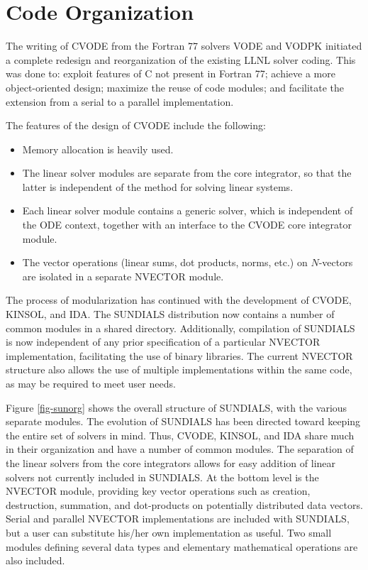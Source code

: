 \section{Code Organization}
\label{s:organization}

The writing of CVODE from the Fortran 77 solvers VODE and VODPK initiated a
complete redesign and reorganization of the existing LLNL solver coding.
This was done to: exploit features of C not present in Fortran 77;
achieve a more object-oriented design; maximize the reuse of code
modules; and facilitate the extension from a serial to a parallel
implementation.

The features of the design of CVODE include the following:
\begin{itemize}
\item Memory allocation is heavily used.
\item The linear solver modules are separate from the core integrator,
so that the latter is independent of the method for solving linear
systems.
\item Each linear solver module contains  a generic solver, which is
independent of the ODE context, together with an interface to the CVODE core
integrator module. 
\item The vector operations  (linear sums, dot products, norms, etc.) on
$N$-vectors are isolated in a separate NVECTOR module.
\end{itemize}

The process of modularization has continued with the development of CVODE,
KINSOL, and IDA. The SUNDIALS distribution now contains a number of common
modules in a shared directory. Additionally, compilation of SUNDIALS is now
independent of any prior specification of a particular NVECTOR
implementation, facilitating the use of binary libraries. The current
NVECTOR structure also allows the use of multiple implementations within the
same code, as may be required to meet user needs.

Figure \ref{fig-sunorg} shows the overall structure of SUNDIALS, with the
various separate modules. The evolution of SUNDIALS has been directed toward
keeping the entire set of solvers in mind. Thus, CVODE, KINSOL, and IDA share
much in their organization and have a number of common modules.  The
separation of the linear solvers from the core integrators allows for easy
addition of linear solvers not currently included in SUNDIALS. At the bottom
level is the NVECTOR module, providing key vector operations such as
creation, destruction, summation, and dot-products on potentially
distributed data vectors. Serial and parallel NVECTOR implementations are
included with SUNDIALS, but a user can substitute his/her own implementation
as useful. Two small modules defining several data types and elementary
mathematical operations are also included.

